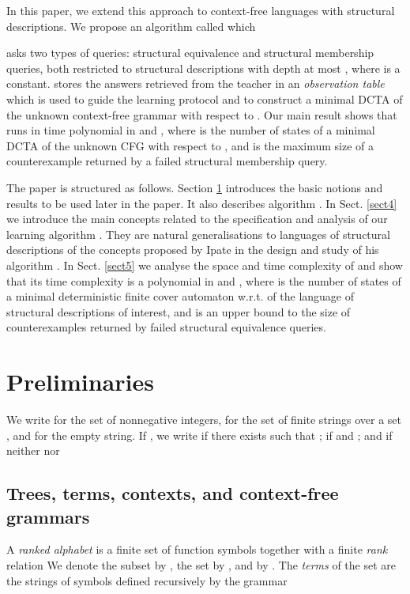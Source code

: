 \documentclass[preprint,12pt,english]{article}
\newcommand\comment[1]{}
\begin{document}
In this paper, we extend this approach to context-free languages with structural descriptions. 
We propose an algorithm called  which 
\comment{is an adaptation of the learning algorithms  and  in the following ways:
It} 
asks two types of queries: structural equivalence and structural membership queries, both restricted to structural descriptions with depth at most , where  is a constant.
 stores the answers retrieved from the teacher in an {\em observation table} which is used to guide the learning protocol and to construct a minimal DCTA of the unknown context-free grammar with respect to .
Our main result shows that  runs in time  polynomial in  and , where  is the number of states of a minimal DCTA of the unknown CFG with respect to , and  is the maximum size of a counterexample returned by a failed structural membership query. 

The paper is structured as follows. Section \ref{prelim} introduces the basic notions and results to be used later in the paper. It also describes algorithm . 
In Sect. \ref{sect4} we introduce the main concepts related to the specification and analysis of our learning algorithm . They are natural generalisations to languages of structural descriptions of the concepts proposed by Ipate \cite{Ipate:2012} in the design and study of his algorithm . In Sect. \ref{sect5} we analyse the space and time complexity of  and show that its time complexity is a polynomial in  and , where  is the number of states of a minimal deterministic finite cover automaton w.r.t.  of the language of structural descriptions of interest, and  is an upper bound to the size of counterexamples returned by failed structural equivalence queries. \section{Preliminaries}
\label{prelim}
We write  for the set of nonnegative integers,  for the set of finite strings over a set , and  for the empty string. If , we write  if there exists  such that ;  if  and ; and  if neither  nor   
\subsection*{Trees, terms, contexts, and context-free grammars}
A {\em ranked alphabet} is a finite set  of function symbols  together with a finite {\em rank} relation  We denote the subset  by ,  the set  by , and   by .
The {\em terms} of the set  are the strings of symbols defined recursively by the grammar
\end{document}
